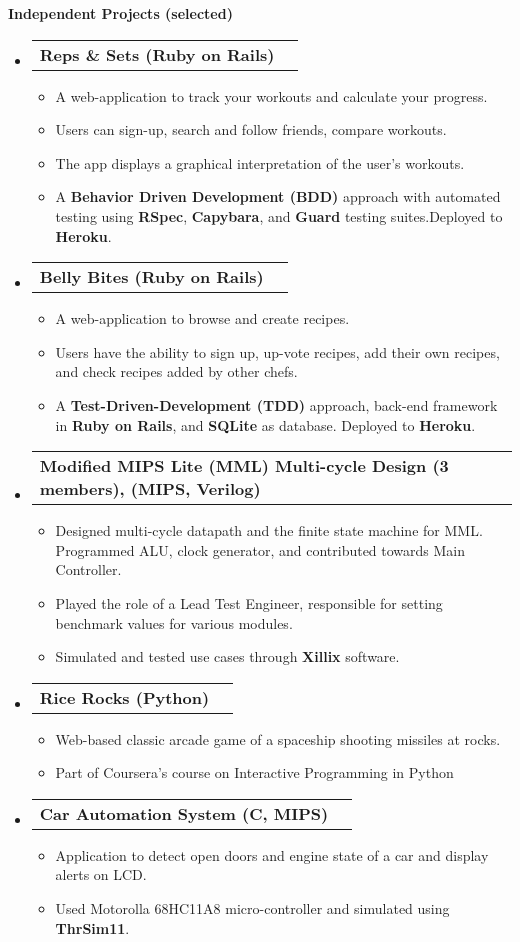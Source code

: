 \documentclass[letterpaper,10pt]{article}
\makeatletter
\newcommand{\resitem}[1]{\item #1 \vspace{-2pt}}
\newcommand{\resheading}[1]{{\large \colorbox{mygrey}{\begin{minipage}{\textwidth}{\textbf{#1 \vphantom{p\^{E}}}}\end{minipage}}}}
\newcommand{\ressubheading}[4]{
\begin{tabular*}{7.0in}{l@{\extracolsep{\fill}}r}
		\textbf{#1} & \textit{#4} \\
\end{tabular*}\vspace{-6pt}}
\makeatother
\begin{document}
\resheading{Independent Projects (selected)}
\begin{itemize}
\item
	\ressubheading{Reps \& Sets (Ruby on Rails)}{}{}{}
	\begin{itemize}
		\resitem{A web-application to track your workouts and calculate your progress.}
        \resitem{Users can sign-up, search and follow friends, compare workouts.} 
        \resitem{The app displays a graphical interpretation of the user's workouts.} 
        \resitem{A \textbf{Behavior Driven Development (BDD)} approach with automated testing using \textbf{RSpec}, \textbf{Capybara}, and \textbf{Guard} testing suites.Deployed to \textbf{Heroku}.}
	\end{itemize}
    
    \item
	\ressubheading{Belly Bites (Ruby on Rails)}{}{}{}
	\begin{itemize}
		\resitem{A web-application to browse and create recipes.}
        \resitem{Users have the ability to sign up, up-vote recipes, add their own recipes, and check recipes added by other chefs.} 
        \resitem{A \textbf{Test-Driven-Development (TDD)} approach, back-end framework in \textbf{Ruby on Rails}, and \textbf{SQLite} as database. Deployed to \textbf{Heroku}.}
        
	\end{itemize}
    
        \item
	\ressubheading{Modified MIPS Lite (MML) Multi-cycle Design (3 members), (MIPS, Verilog)}{}{}{}
	\begin{itemize}
		\resitem{Designed multi-cycle datapath and the finite state machine for MML. Programmed ALU, clock generator, and contributed towards Main Controller.}
        \resitem{Played the role of a Lead Test Engineer, responsible for setting benchmark values for various modules.}
        \resitem{Simulated and tested use cases through \textbf{Xillix} software.}        
	\end{itemize}
    
     \item
	\ressubheading{Rice Rocks (Python)}{}{}{}
	\begin{itemize}
		\resitem{Web-based classic arcade game of a spaceship shooting missiles at rocks.}
        \resitem{Part of Coursera's course on Interactive Programming in Python}
	\end{itemize}
 
 	\item
	\ressubheading{Car Automation System (C, MIPS)}{}{}{}
	\begin{itemize}
		\resitem{Application to detect open doors and engine state of a car and display alerts on LCD.}
        \resitem{Used Motorolla 68HC11A8 micro-controller and simulated using \textbf{ThrSim11}.}         
	\end{itemize}
 

\end{itemize}
\end{document}
